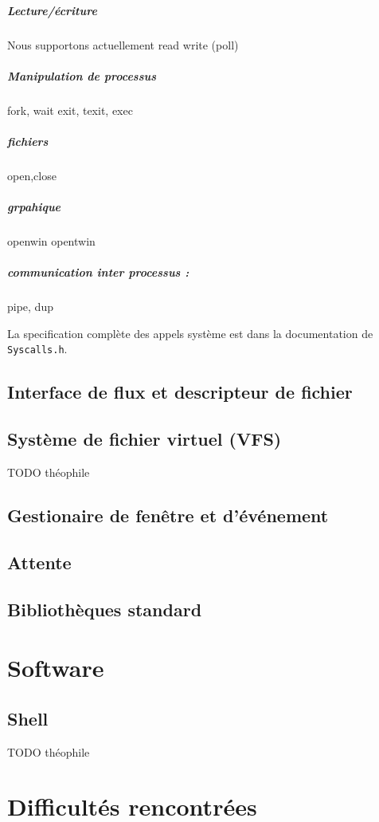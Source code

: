 \documentclass[12pt]{report}
\begin{document}
\paragraph{Lecture/écriture}

Nous supportons actuellement read write  (poll)

\paragraph{Manipulation de processus} fork, wait exit, texit, exec

\paragraph{fichiers} open,close

\paragraph{grpahique} openwin opentwin

\paragraph{communication inter processus :} pipe, dup


La specification complète des appels système est dans la documentation de \verb$Syscalls.h$.

\section{Interface de flux et descripteur de fichier}


\section{Système de fichier virtuel (VFS)}

TODO théophile

\section{Gestionaire de fenêtre et d'événement}

\section{Attente}

\section{Bibliothèques standard}

\chapter{Software}

\section{Shell}

TODO théophile
\chapter{Difficultés rencontrées}





\end{document}
